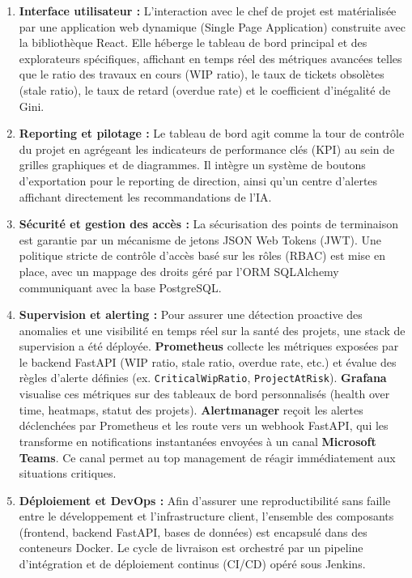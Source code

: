 \begin{enumerate}
\item \textbf{Interface utilisateur :} L'interaction avec le chef de projet est matérialisée par une application web dynamique (Single Page Application) construite avec la bibliothèque React. Elle héberge le tableau de bord principal et des explorateurs spécifiques, affichant en temps réel des métriques avancées telles que le ratio des travaux en cours (WIP ratio), le taux de tickets obsolètes (stale ratio), le taux de retard (overdue rate) et le coefficient d'inégalité de Gini.
\item \textbf{Reporting et pilotage :} Le tableau de bord agit comme la tour de contrôle du projet en agrégeant les indicateurs de performance clés (KPI) au sein de grilles graphiques et de diagrammes. Il intègre un système de boutons d'exportation pour le reporting de direction, ainsi qu'un centre d'alertes affichant directement les recommandations de l'IA.
\item \textbf{Sécurité et gestion des accès :} La sécurisation des points de terminaison est garantie par un mécanisme de jetons JSON Web Tokens (JWT). Une politique stricte de contrôle d'accès basé sur les rôles (RBAC) est mise en place, avec un mappage des droits géré par l'ORM SQLAlchemy communiquant avec la base PostgreSQL.
\item \textbf{Supervision et alerting :} Pour assurer une détection proactive des anomalies et une visibilité en temps réel sur la santé des projets, une stack de supervision a été déployée. \textbf{Prometheus} collecte les métriques exposées par le backend FastAPI (WIP ratio, stale ratio, overdue rate, etc.) et évalue des règles d’alerte définies (ex. \texttt{CriticalWipRatio}, \texttt{ProjectAtRisk}). \textbf{Grafana} visualise ces métriques sur des tableaux de bord personnalisés (health over time, heatmaps, statut des projets). \textbf{Alertmanager} reçoit les alertes déclenchées par Prometheus et les route vers un webhook FastAPI, qui les transforme en notifications instantanées envoyées à un canal \textbf{Microsoft Teams}. Ce canal permet au top management de réagir immédiatement aux situations critiques.
\item \textbf{Déploiement et DevOps :} Afin d'assurer une reproductibilité sans faille entre le développement et l'infrastructure client, l'ensemble des composants (frontend, backend FastAPI, bases de données) est encapsulé dans des conteneurs Docker. Le cycle de livraison est orchestré par un pipeline d'intégration et de déploiement continus (CI/CD) opéré sous Jenkins.
\end{enumerate}

